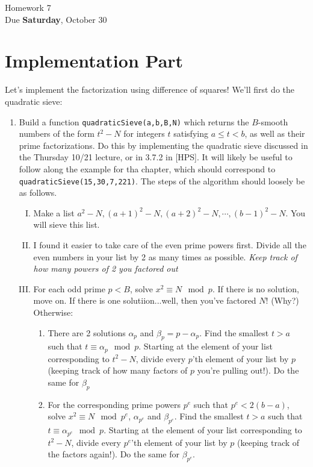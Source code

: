 \documentclass[11pt]{article}
\begin{document}
\begin{center}
\Large {Homework 7}\\
\small {Due \textbf{Saturday}, October 30}
\end{center}
\section*{Implementation Part}
Let's implement the factorization using difference of squares!  We'll first do the quadratic sieve:
\begin{enumerate}
  \item{Build a function \verb|quadraticSieve(a,b,B,N)| which returns the $B$-smooth numbers of the form $t^2-N$ for integers $t$ satisfying $a\le t< b$, as well as their prime factorizations.  Do this by implementing the quadratic sieve discussed in the Thursday 10/21 lecture, or in 3.7.2 in [HPS].  It will likely be useful to follow along the example for tha chapter, which should correspond to \verb|quadraticSieve(15,30,7,221)|.  The steps of the algorithm should loosely be as follows.
  \begin{enumerate}[(I)]
    \item{Make a list $a^2-N, (a+1)^2-N, (a+2)^2-N,\cdots,(b-1)^2-N$.  You will sieve this list.}
    \item{I found it easier to take care of the even prime powers first.  Divide all the even numbers in your list by 2 as many times as possible.  \textit{Keep track of how many powers of 2 you factored out}}
    \item{For each odd prime $p<B$, solve $x^2\equiv N\mod p$.  If there is no solution, move on.  If there is one solutiion...well, then you've factored $N$! (Why?) Otherwise:
    \begin{enumerate}
      \item{There are 2 solutions $\alpha_p$ and $\beta_p = p-\alpha_p$.  Find the smallest $t>a$ such that $t\equiv\alpha_p\mod p$.  Starting at the element of your list corresponding to $t^2-N$, divide every $p$'th element of your list by $p$ (keeping track of how many factors of $p$ you're pulling out!).  Do the same for $\beta_p$}
      \item{For the corresponding prime powers $p^e$ such that $p^e<2(b-a)$, solve $x^2\equiv N\mod p^e$, $\alpha_{p^e}$ and $\beta_{p^e}$.  Find the smallest $t>a$ such that $t\equiv\alpha_{p^e}\mod p$.  Starting at the element of your list corresponding to $t^2-N$, divide every $p^e$'th element of your list by $p$ (keeping track of the factors again!).  Do the same for $\beta_{p^e}$.}

\end{enumerate}}
\end{enumerate}}
\end{enumerate}
\end{document}
